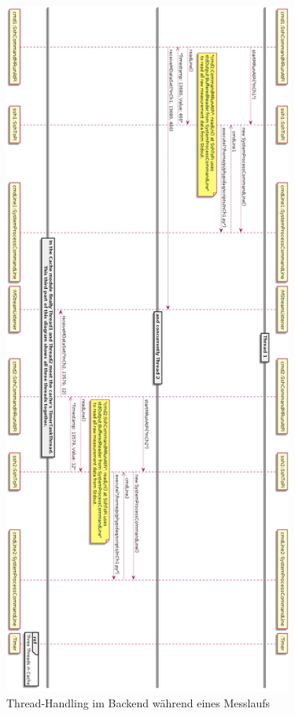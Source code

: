 \documentclass[parskip=full]{scrartcl}
\begin{document}
\begin{figure}[htbp]
	\begin{center}
		\includegraphics[width = 9.5cm]{Grafiken/5-MRunThreadingBackend_Rotated.png}
		\caption{Thread-Handling im Backend während eines Messlaufs}
		\label{ThreadingBackend}
	\end{center}
\end{figure}
\end{document}
